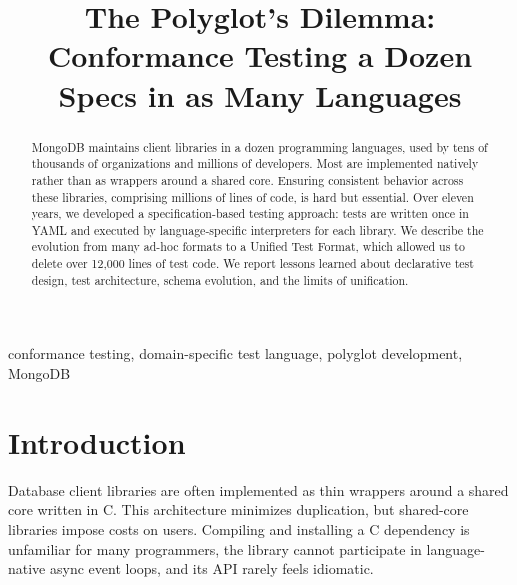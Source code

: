 \documentclass[conference]{IEEEtran}
\begin{document}
\title{The Polyglot's Dilemma: Conformance Testing a Dozen Specs in as Many Languages}

\author{
}

\maketitle

\begin{abstract}
MongoDB maintains client libraries in a dozen programming languages, used by tens of thousands of organizations and millions of developers. Most are implemented natively rather than as wrappers around a shared core. Ensuring consistent behavior across these libraries, comprising millions of lines of code, is hard but essential. Over eleven years, we developed a specification-based testing approach: tests are written once in YAML and executed by language-specific interpreters for each library. We describe the evolution from many ad-hoc formats to a Unified Test Format, which allowed us to delete over 12,000 lines of test code. We report lessons learned about declarative test design, test architecture, schema evolution, and the limits of unification.
\end{abstract}

\begin{IEEEkeywords}
conformance testing, domain-specific test language, polyglot development, MongoDB
\end{IEEEkeywords}

\section{Introduction}

Database client libraries are often implemented as thin wrappers around a shared core written in C. This architecture minimizes duplication, but shared-core libraries impose costs on users. Compiling and installing a C dependency is unfamiliar for many programmers, the library cannot participate in language-native async event loops, and its API rarely feels idiomatic.
\end{document}

